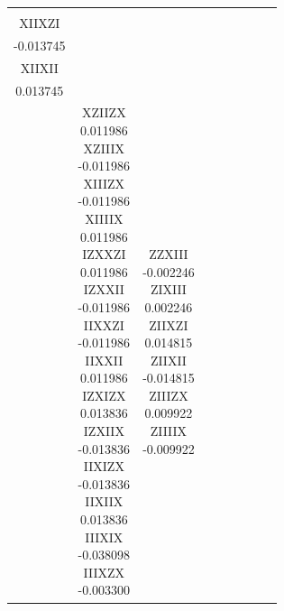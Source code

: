 \documentclass[twocolumn]{revtex4-1}
\newcommand{\1}{\mathbbm{1}}
\begin{document}
\begin{longtable}{|c|c|c|c|c|c|c|c|c|}
{{-0.013745\\ 
XIIXZI\\
-0.013745\\ 
XIIXII\\
0.013745\\ 
\vspace{.5\baselineskip}}
}
&
\multicolumn{1}{c|}{
\parbox{1.9cm}{\centering\vspace{.5\baselineskip}
XZIIZX\\
0.011986\\ 
XZIIIX\\
-0.011986\\ 
XIIIZX\\
-0.011986\\ 
XIIIIX\\
0.011986\\ 
IZXXZI\\
0.011986\\ 
IZXXII\\
-0.011986\\ 
IIXXZI\\
-0.011986\\ 
IIXXII\\
0.011986\\ 
IZXIZX\\
0.013836\\ 
IZXIIX\\
-0.013836\\ 
IIXIZX\\
-0.013836\\ 
IIXIIX\\
0.013836\\ 
IIIXIX\\
-0.038098\\ 
IIIXZX\\
-0.003300\\ 
\vspace{.5\baselineskip}}
}
&
\parbox{1.9cm}{\centering\vspace{.5\baselineskip}
ZZXIII\\
-0.002246\\ 
ZIXIII\\
0.002246\\ 
ZIIXZI\\
0.014815\\ 
ZIIXII\\
-0.014815\\ 
ZIIIZX\\
0.009922\\ 
ZIIIIX\\
-0.009922\\ 
}
\end{longtable}
\end{document}
